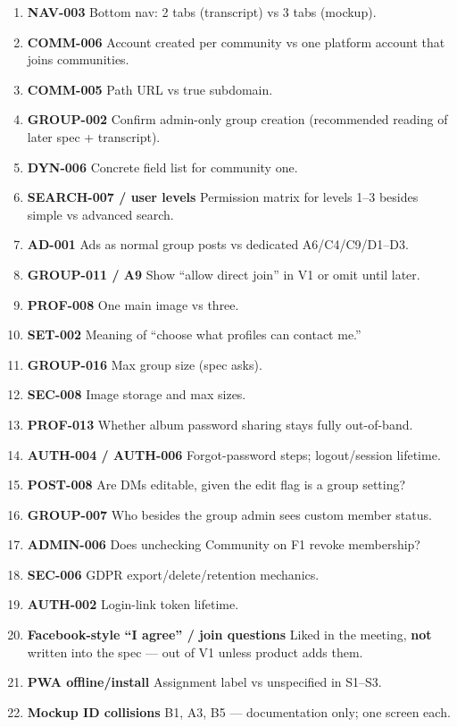 \documentclass[11pt,a4paper]{article}
\begin{document}
\begin{enumerate}[leftmargin=1.6em]
  \item \textbf{NAV-003} Bottom nav: 2 tabs (transcript) vs 3 tabs (mockup).
  \item \textbf{COMM-006} Account created per community vs one platform account that joins communities.
  \item \textbf{COMM-005} Path URL vs true subdomain.
  \item \textbf{GROUP-002} Confirm admin-only group creation (recommended reading of later spec + transcript).
  \item \textbf{DYN-006} Concrete field list for community one.
  \item \textbf{SEARCH-007 / user levels} Permission matrix for levels 1--3 besides simple vs advanced search.
  \item \textbf{AD-001} Ads as normal group posts vs dedicated A6/C4/C9/D1--D3.
  \item \textbf{GROUP-011 / A9} Show ``allow direct join'' in V1 or omit until later.
  \item \textbf{PROF-008} One main image vs three.
  \item \textbf{SET-002} Meaning of ``choose what profiles can contact me.''
  \item \textbf{GROUP-016} Max group size (spec asks).
  \item \textbf{SEC-008} Image storage and max sizes.
  \item \textbf{PROF-013} Whether album password sharing stays fully out-of-band.
  \item \textbf{AUTH-004 / AUTH-006} Forgot-password steps; logout/session lifetime.
  \item \textbf{POST-008} Are DMs editable, given the edit flag is a group setting?
  \item \textbf{GROUP-007} Who besides the group admin sees custom member status.
  \item \textbf{ADMIN-006} Does unchecking Community on F1 revoke membership?
  \item \textbf{SEC-006} GDPR export/delete/retention mechanics.
  \item \textbf{AUTH-002} Login-link token lifetime.
  \item \textbf{Facebook-style ``I agree'' / join questions} Liked in the meeting, \textbf{not} written into the spec --- out of V1 unless product adds them.
  \item \textbf{PWA offline/install} Assignment label vs unspecified in S1--S3.
  \item \textbf{Mockup ID collisions} B1, A3, B5 --- documentation only; one screen each.
\end{enumerate}
\end{document}
